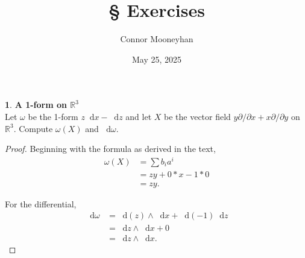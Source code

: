 \documentclass[12pt]{article}
\title{\S\arabic{section} Exercises}
\author{Connor Mooneyhan}
\date{May 25, 2025}
\newcommand{\dd}{\mathop{}\!\mathrm{d}}
\theoremstyle{definition}
\newtheorem{ex}{}[section]
\begin{document}
\maketitle

\begin{ex}
	\textbf{A 1-form on $\mathbb{R}^3$} \\
	Let $\omega$ be the 1-form $z\dd x - \dd z$ and let $X$ be the vector field $y\partial / \partial x + x \partial / \partial y$ on $\mathbb{R}^3$.
	Compute $\omega(X)$ and $\dd\omega$.
\end{ex}
\begin{proof}
	Beginning with the formula as derived in the text, \begin{align*}
		\omega(X) & = \sum b_ia^i        \\
		          & = zy + 0 * x - 1 * 0 \\
		          & = zy.
	\end{align*}

	For the differential, \begin{align*}
		\dd\omega & = \dd(z) \wedge \dd x + \dd(-1)\dd z \\
		          & = \dd z \wedge \dd x + 0             \\
		          & = \dd z \wedge \dd x.
	\end{align*}
\end{proof}
\end{document}
